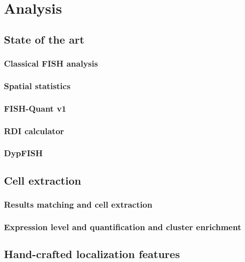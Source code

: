 
\graphicspath{{./figures/chapter_4/}}


\chapter{Analysis} \label{chap:chapter_4}
\minitoc
\newpage


\section{State of the art}


\subsection{Classical \ac{FISH} analysis}

\subsection{Spatial statistics}

\subsection{FISH-Quant v1}

\subsection{RDI calculator}

\subsection{DypFISH}


\section{Cell extraction}


\subsection{Results matching and cell extraction}

\subsection{Expression level and quantification and cluster enrichment}


\section{Hand-crafted localization features}


